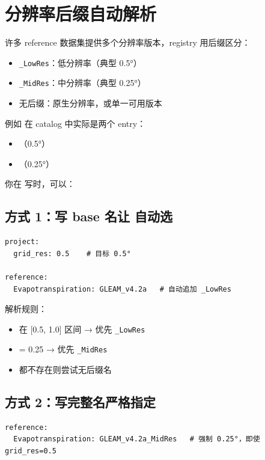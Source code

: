 \section{分辨率后缀自动解析}

许多 reference 数据集提供多个分辨率版本，registry 用后缀区分：

\begin{itemize}
  \item \texttt{\_LowRes}：低分辨率（典型 0.5°）
  \item \texttt{\_MidRes}：中分辨率（典型 0.25°）
  \item 无后缀：原生分辨率，或单一可用版本
\end{itemize}

例如  在 catalog 中实际是两个 entry：

\begin{itemize}
  \item {}（0.5°）
  \item {}（0.25°）
\end{itemize}

你在  写时，可以：

\subsection{方式 1：写 base 名让 \openbench{} 自动选}

\begin{verbatim}
project:
  grid_res: 0.5    # 目标 0.5°

reference:
  Evapotranspiration: GLEAM_v4.2a   # 自动追加 _LowRes
\end{verbatim}

解析规则：

\begin{itemize}
  \item {} 在 [0.5, 1.0] 区间 → 优先 \texttt{\_LowRes}
  \item {} = 0.25 → 优先 \texttt{\_MidRes}
  \item 都不存在则尝试无后缀名
\end{itemize}

\subsection{方式 2：写完整名严格指定}

\begin{verbatim}
reference:
  Evapotranspiration: GLEAM_v4.2a_MidRes   # 强制 0.25°，即使 grid_res=0.5
\end{verbatim}

